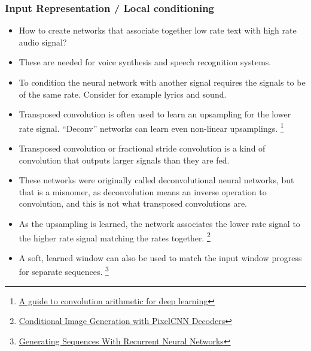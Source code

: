\documentclass[8pt]{beamer}
\begin{document}
\begin{frame}
\frametitle{Input Representation / Local conditioning}
 \begin{itemize}
  \item How to create networks that associate together low rate text with high rate audio signal?
  \item These are needed for voice synthesis and speech recognition systems.
  \item To condition the neural network with another signal requires the signals to be of the same rate. Consider for example lyrics and sound.
  \item Transposed convolution is often used to learn an upsampling for the lower rate signal. ``Deconv'' networks can learn even non-linear upsamplings.
        \footnote{\href{https://arxiv.org/abs/1603.07285}
                       {A guide to convolution arithmetic for deep learning}}
  \item Transposed convolution or fractional stride convolution is a kind of convolution that outputs larger signals than they are fed.
  \item These networks were originally called deconvolutional neural networks, but that is a misnomer, as deconvolution means an inverse operation to convolution,
        and this is not what transposed convolutions are.
  \item As the upsampling is learned, the network associates the lower rate signal to the higher rate signal matching the rates together.
        \footnote{\href{https://arxiv.org/abs/1606.05328v2}
                       { Conditional Image Generation with PixelCNN Decoders}}
  \item A soft, learned window can also be used to match the input window progress for separate sequences.
        \footnote{\href{http://arxiv.org/abs/1308.0850v5}
                       { Generating Sequences With Recurrent Neural Networks}}
 \end{itemize}
\end{frame}
\end{document}
